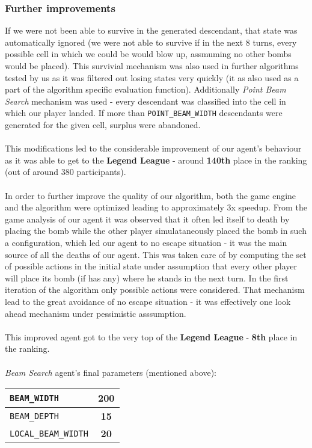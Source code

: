\documentclass[11pt]{article}
\begin{document}
    \subsubsection*{Further improvements}
    If we were not been able to survive in the generated descendant, that state was automatically ignored (we were not able to survive if in the next 8 turns, every possible cell in which we could be would blow up, assmuming no other bombs would be placed). This survivial mechanism was also used in further algorithms tested by us as it was filtered out losing states very quickly (it as also used as a part of the algorithm specific evaluation function). Additionally \textit{Point Beam Search} mechanism was used - every descendant was classified into the cell in which our player landed. If more than \texttt{POINT\_BEAM\_WIDTH} descendants were generated for the given cell, surplus were abandoned. \\ \\
    This modifications led to the considerable improvement of our agent's behaviour as it was able to get to the \textbf{Legend League} - around \textbf{140th} place in the ranking (out of around 380 participants). \\ \\
    In order to further improve the quality of our algorithm, both the game engine and the algorithm were optimized leading to approximately 3x speedup. From the game analysis of our agent it was observed that it often led itself to death by placing the bomb while the other player simulataneously placed the bomb in such a configuration, which led our agent to no escape situation - it was the main source of all the deaths of our agent. This was taken care of by computing the set of possible actions in the initial state under assumption that every other player will place its bomb (if has any) where he stands in the next turn. In the first iteration of the algorithm only possible actions were considered. That mechanism lead to the great avoidance of no escape situation - it was effectively one look ahead mechanism under pessimistic asssumption. \\ \\
    This improved agent got to the very top of the \textbf{Legend League} - \textbf{8th} place in the ranking.\\ \\
    \textit{Beam Search} agent's final parameters (mentioned above):
    \begin{center}
		\begin{tabular}{| l | c |}
			\hline
			\texttt{BEAM\_WIDTH} & \textbf{200} \\ \hline
			\texttt{BEAM\_DEPTH} & \textbf{15} \\ \hline
			\texttt{LOCAL\_BEAM\_WIDTH} & \textbf{20} \\ \hline
		\end{tabular}
	\end{center}
    
\end{document}
